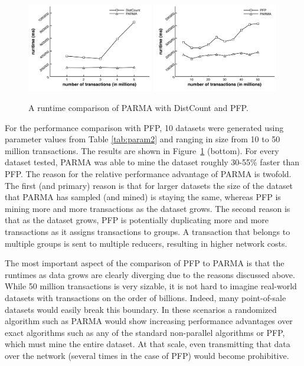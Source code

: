 \begin{figure}[htb]
  \centering
    \includegraphics[width=0.49\textwidth]{parma/distributed_counting}
    \hfill
    \includegraphics[width=0.49\textwidth]{parma/performance}
  \caption{A runtime comparison of PARMA with DistCount and PFP.}
\label{fig:parmaperformance}
\end{figure}

For the performance comparison with PFP, 10 datasets were generated
using parameter values from Table \ref{tab:param2} and ranging in size
from 10 to 50 million transactions.
The results are shown in
Figure~\ref{fig:parmaperformance} (bottom).
  For every dataset tested, PARMA was able
to mine the dataset roughly 30-55\% faster than PFP. The reason for the
relative performance advantage of PARMA is twofold. The first (and
primary) reason is that for larger datasets the size of the dataset that
PARMA has sampled (and mined) is staying the same, whereas PFP is mining
more and more transactions as the dataset grows. The second reason is
that as the dataset grows, PFP is potentially duplicating more and more
transactions as it assigns transactions to groups. A transaction that
belongs to multiple groups is sent to multiple reducers, resulting in
higher network costs.

The most important aspect of the comparison of PFP to PARMA is that the
runtimes as data grows are clearly diverging due to the reasons
discussed above. While 50 million transactions is very sizable, it is
not hard to imagine real-world datasets with transactions on the order
of billions. Indeed, many point-of-sale datasets would easily break this
boundary. In these scenarios a randomized algorithm such as PARMA would
show increasing performance advantages over exact algorithms such as any
of the standard non-parallel algorithms or PFP, which must mine the
entire dataset. At that scale, even transmitting that data over the
network (several times in the case of PFP) would become prohibitive.

